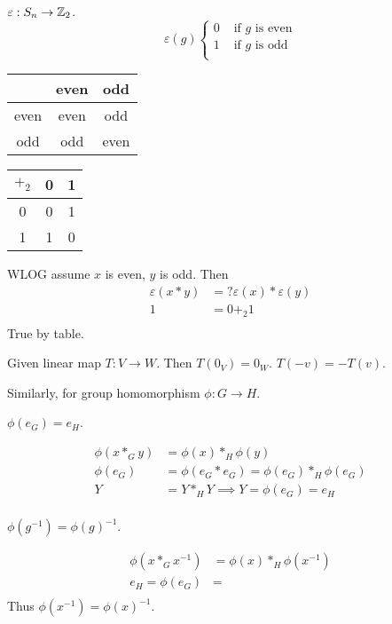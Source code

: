 \documentclass[class=article,crop=false]{standalone}
\begin{document}
\begin{eg}
$ \varepsilon: S_n \to \mathbb{Z}_2$.
\begin{equation*}
	\varepsilon(g)
\begin{cases}
	0 & \text{ if }g \text{ is even}  \\
	1 & \text{ if } g \text{ is odd}  \\
\end{cases}
\end{equation*}
\begin{table}[H]
	\centering
	\begin{tabular}{c||c|c}
	&even&odd\\
	\hline
	\hline
		even&even&odd\\
		\hline
		odd&odd&even\\
	\end{tabular}
\end{table}
\begin{table}[H]
	\centering
	\begin{tabular}{c||c|c}
	$+_2$&0&1\\
	\hline
	\hline
		0&0&1\\
		\hline
		1&1&0\\
	\end{tabular}
\end{table}
WLOG assume $ x$ is even,  $ y$ is odd. Then
 \begin{align*}
	 \varepsilon(x*y) &=? \varepsilon(x) * \varepsilon(y) \\
	 1&= 0 +_2 1 \\
\end{align*}
True by table.

\end{eg}

\begin{note}[]
	Given linear map $ T: V \to W$. Then $ T(0_V) = 0_W$.  $ T(-v) = -T(v)$.

\end{note}
Similarly, for group homomorphism $\phi: G \to H$.
\begin{claim}[]
	$ \phi(e_G)=e_H$.
\end{claim}
\begin{prf}
\begin{align*}
	\phi(x*_G y ) &= \phi(x) *_H \phi(y)\\
	\phi(e_G) &= \phi(e_G * e_G) = \phi(e_G) *_H \phi(e_G) \\
	Y &= Y *_H Y \implies Y=\phi(e_G) = e_H \\
\end{align*}
\end{prf}
\begin{claim}[]
	$ \phi(g^{-1}) = \phi(g)^{-1}$.
\end{claim}
\begin{prf}
\begin{align*}
	\phi(x*_G x^{-1}) &= \phi(x) *_H \phi(x^{-1}) \\
	e_H = \phi(e_G) &=  \\
\end{align*}
Thus $ \phi(x^{-1}) = \phi(x)^{-1}$.
\end{prf}
\end{document}
